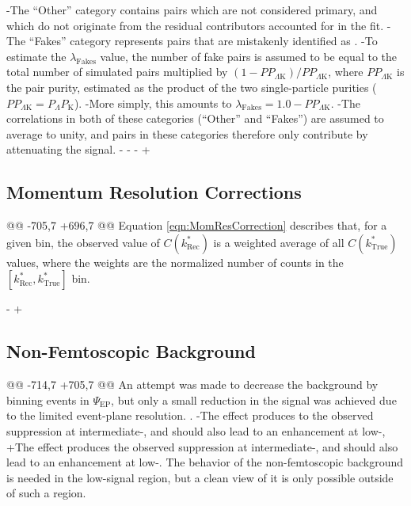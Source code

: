 -The ``Other'' category contains pairs which are not considered primary, and which do not originate from the residual contributors accounted for in the fit.  
-The ``Fakes'' category represents pairs that are mistakenly identified as \LamK.  
-To estimate the $\lambda_{\mathrm{Fakes}}$ value, the number of fake pairs is assumed to be equal to the total number of simulated pairs multiplied by $(1-PP_{\Lambda\mathrm{K}})/PP_{\Lambda\mathrm{K}}$, where $PP_{\Lambda\mathrm{K}}$ is the \LamK pair purity, estimated as the product of the two single-particle purities ($PP_{\Lambda\mathrm{K}} = P_{\Lambda}P_{\mathrm{K}}$).
-More simply, this amounts to $\lambda_{\mathrm{Fakes}} = 1.0-PP_{\Lambda\mathrm{K}}$.
-The correlations in both of these categories (``Other'' and ``Fakes'') are assumed to average to unity, and pairs in these categories therefore only contribute by attenuating the signal. 
-
-
-
+%
 \subsection{Momentum Resolution Corrections}
 \label{MomentumResolutionCorrections}
 
@@ -705,7 +696,7 @@
 Equation \ref{eqn:MomResCorrection} describes that, for a given \krec bin, the observed value of $C(k^{*}_{\mathrm{Rec}})$ is a weighted average of all $C(k^{*}_{\mathrm{True}})$ values, where the weights are the normalized number of counts in the \mbox{$[k^{*}_{\mathrm{Rec}}, k^{*}_{\mathrm{True}}]$} bin.
 
 
-
+%
 \subsection{Non-Femtoscopic Background}
 \label{NonFlatBackground}
 
@@ -714,7 +705,7 @@
 {
 An attempt was made to decrease the background by binning events in $\Psi_{\mathrm{EP}}$, but only a small reduction in the signal was achieved due to the limited event-plane resolution.
 }\cite{Kisiel:2017}.
-The effect produces to the observed suppression at intermediate-\kstar, and should also lead to an enhancement at low-\kstar,
+The effect produces the observed suppression at intermediate-\kstar, and should also lead to an enhancement at low-\kstar.
 The behavior of the non-femtoscopic background is needed in the low-\kstar signal region, but a clean view of it is only possible outside of such a region.
 
